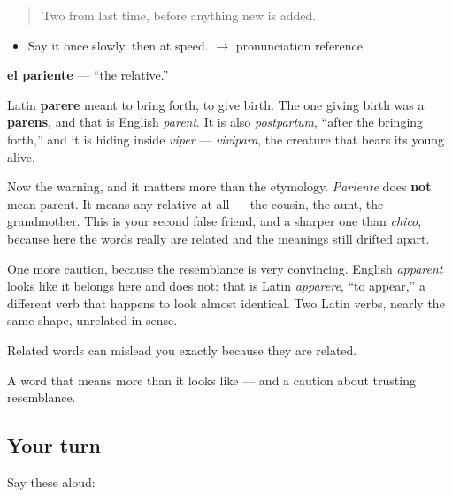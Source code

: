 \label{lesson:ES-C309-pariente}



\begin{quote}
Two from last time, before anything new is added.
\end{quote}

\begin{sounds}
\begin{itemize}
\raggedright
  \item Say it once slowly, then at speed. $\to$ pronunciation reference
\end{itemize}
\end{sounds}

\begin{cousinweb}
\textbf{el pariente} --- \textquotedblleft{}the relative.\textquotedblright{}

Latin \textbf{parere} meant to bring forth, to give birth. The one giving birth was a \textbf{parens}, and that is English \emph{parent}. It is also \emph{postpartum}, \textquotedblleft{}after the bringing forth,\textquotedblright{} and it is hiding inside \emph{viper} --- \emph{vivipara}, the creature that bears its young alive.

Now the warning, and it matters more than the etymology. \emph{Pariente} does \textbf{not} mean parent. It means any relative at all --- the cousin, the aunt, the grandmother. This is your second false friend, and a sharper one than \emph{chico}, because here the words really are related and the meanings still drifted apart.

One more caution, because the resemblance is very convincing. English \emph{apparent} looks like it belongs here and does not: that is Latin \emph{apparēre}, \textquotedblleft{}to appear,\textquotedblright{} a different verb that happens to look almost identical. Two Latin verbs, nearly the same shape, unrelated in sense.

Related words can mislead you exactly because they are related.
\end{cousinweb}

\begin{grammarlens}[title={What you've built}]
A word that means more than it looks like --- and a caution about trusting resemblance.
\end{grammarlens}

\subsection*{Your turn}
Say these aloud:

